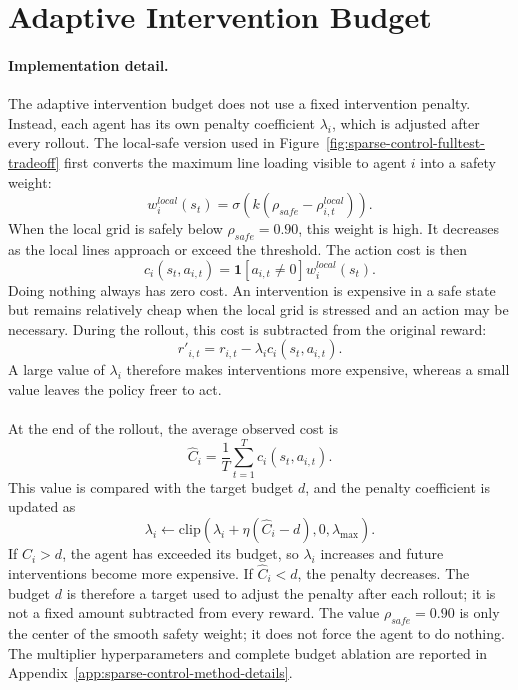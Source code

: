 \section{Adaptive Intervention Budget}
\label{subsec:sparse-control-aib}

{\color{black}
\paragraph{Implementation detail.}
The adaptive intervention budget does not use a fixed intervention penalty.
Instead, each agent has its own penalty coefficient \(\lambda_i\), which is
adjusted after every rollout. The local-safe version used in
Figure~\ref{fig:sparse-control-fulltest-tradeoff} first converts the maximum
line loading visible to agent \(i\) into a safety weight:
\[
  w_i^{local}(s_t)=
  \sigma\!\left(k\left(\rho_{safe}-\rho_{i,t}^{local}\right)\right).
\]
When the local grid is safely below \(\rho_{safe}=0.90\), this weight is high.
It decreases as the local lines approach or exceed the threshold. The action
cost is then
\[
  c_i(s_t,a_{i,t})=
  \mathbf{1}[a_{i,t}\neq0]w_i^{local}(s_t).
\]
Doing nothing always has zero cost. An intervention is expensive in a safe
state but remains relatively cheap when the local grid is stressed and an
action may be necessary. During the rollout, this cost is subtracted from the
original reward:
\[
  r'_{i,t}=r_{i,t}-\lambda_i c_i(s_t,a_{i,t}).
\]
A large value of \(\lambda_i\) therefore makes interventions more expensive,
whereas a small value leaves the policy freer to act.
\\
\\
At the end of the rollout, the average observed cost is
\[
  \hat C_i=\frac{1}{T}\sum_{t=1}^{T}c_i(s_t,a_{i,t}).
\]
This value is compared with the target budget \(d\), and the penalty
coefficient is updated as
\[
  \lambda_i\leftarrow
  \mathrm{clip}\left(
    \lambda_i+\eta(\hat C_i-d),
    0,
    \lambda_{\max}
  \right).
\]
If \(\hat C_i>d\), the agent has exceeded its budget, so \(\lambda_i\)
increases and future interventions become more expensive. If
\(\hat C_i<d\), the penalty decreases. The budget \(d\) is therefore a target
used to adjust the penalty after each rollout; it is not a fixed amount
subtracted from every reward. The value \(\rho_{safe}=0.90\) is only the center
of the smooth safety weight; it does not force the agent to do nothing. The
multiplier hyperparameters and complete budget ablation are reported in
Appendix~\ref{app:sparse-control-method-details}.
}

